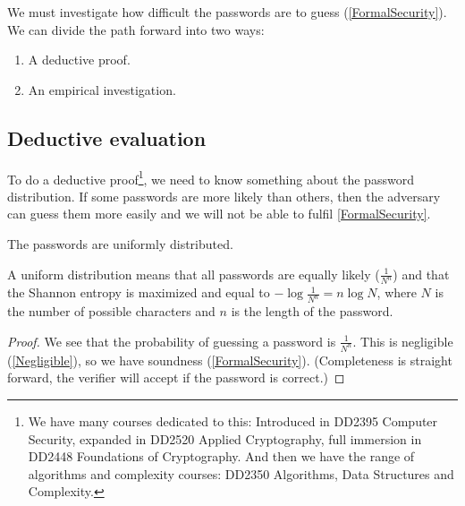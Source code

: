 \begin{frame}
  \begin{solution}
    We must investigate how difficult the passwords are to guess 
    (\cref{FormalSecurity}).
    We can divide the path forward into two ways:
    \begin{enumerate}
      \item A deductive proof.
      \item An empirical investigation.
    \end{enumerate}
  \end{solution}
\end{frame}

\subsection{Deductive evaluation}

To do a deductive proof\footnote{%
  We have many courses dedicated to this:
  Introduced in DD2395 Computer Security,
  expanded in DD2520 Applied Cryptography,
  full immersion in DD2448 Foundations of Cryptography.
  And then we have the range of algorithms and complexity courses:
  \eg DD2350 Algorithms, Data Structures and Complexity.
}, we need to know something about the password distribution.
If some passwords are more likely than others, then the adversary can guess 
them more easily and we will not be able to fulfil \cref{FormalSecurity}.

\begin{frame}
  \begin{assumption}\label{AssumeUniform}
    The passwords are uniformly distributed.
  \end{assumption}
\end{frame}

A uniform distribution means that
all passwords are equally likely (\(\frac{1}{N^n}\))
and that
the Shannon entropy is maximized and equal to \(-\log \frac{1}{N^n} = n \log 
{N}\),
where \(N\) is the number of possible characters and \(n\) is the length of the 
password.

\begin{frame}
  \begin{proof}
    We see that the probability of guessing a password is \(\frac{1}{N^n}\).
    This is negligible (\cref{Negligible}), so we have soundness 
    (\cref{FormalSecurity}).
    (Completeness is straight forward, the verifier will accept if the password 
    is correct.)
  \end{proof}
\end{frame}

